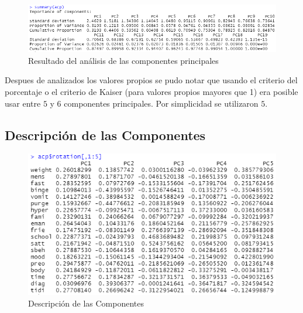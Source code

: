 \documentclass[a4paper,10pt,twocolumn]{article}
\begin{document}
\begin{figure}[htb]%
	\begin{center}
		\includegraphics[width=\linewidth]{acp}
	\end{center}
	\caption{Resultado del análisis de las componentes principales \label{fig:acp}}%
\end{figure}

Despues de analizados los valores propios se pudo notar que usando el criterio del porcentaje o el criterio de Kaiser (para valores propios mayores que 1) era posible usar entre $5$ y $6$ componentes principales. Por simplicidad se utilizaron $5$.

\subsection{Descripción de las Componentes}\label{sec:desc_comp}

\begin{figure}[htb]%
	\begin{center}
		\includegraphics[width=\linewidth]{rotation}
	\end{center}
	\caption{Descripción de las Componentes \label{fig:rotation}}%
\end{figure}
\end{document}
